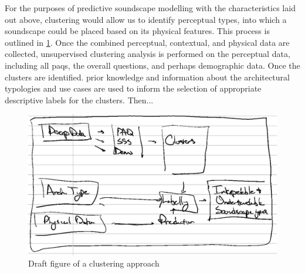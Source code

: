 For the purposes of predictive soundscape modelling with the characteristics laid out above, clustering would allow us to identify perceptual types, into which a soundscape could be placed based on its physical features. This process is outlined in \cref{fig:clusterModel}. Once the combined perceptual, contextual, and physical data are collected, unsupervised clustering analysis is performed on the perceptual data, including all \glspl{paq}, the overall questions, and perhaps demographic data. Once the clusters are identified. prior knowledge and information about the architectural typologies and use cases are used to inform the selection of appropriate descriptive labels for the clusters. Then... %

\begin{figure}
  \includegraphics[width=\textwidth]{Figures/Remarkable clustering figure.jpg}
  \caption{Draft figure of a clustering approach}\label{fig:clusterModel}
\end{figure}

